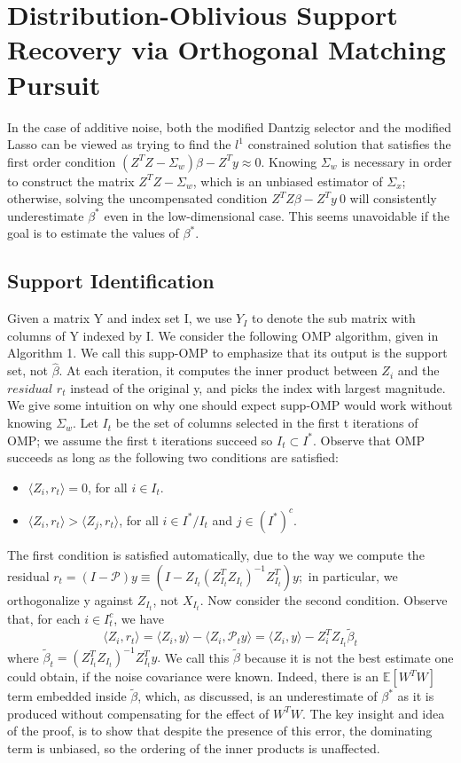 \documentclass[a4paper,10pt]{article}
\theoremstyle{definition}
\begin{document}
\section{Distribution-Oblivious Support Recovery via Orthogonal Matching Pursuit}
In the case of additive noise, both the modified Dantzig selector and the modified Lasso can be viewed as trying to find the $l^1$ constrained solution that satisfies the first order condition $(Z^TZ - \Sigma_w)\beta-Z^Ty \approx 0$. Knowing $\Sigma_w$ is necessary in order to construct the matrix $Z^TZ-\Sigma_w$, which is an unbiased estimator of $\Sigma_x$; otherwise, solving the uncompensated condition $Z^TZ\beta - Z^Ty ~ 0$ will consistently underestimate $\beta^*$ even in the low-dimensional case. This seems unavoidable if the goal is to estimate the values of $\beta^*$.

\subsection{Support Identification}
Given a matrix Y and index set I, we use $Y_I$ to denote the sub matrix with columns of Y indexed by I. We consider the following OMP algorithm, given in Algorithm 1. We call this supp-OMP to emphasize that its output is the support set, not $\hat{\beta}$. At each iteration, it computes the inner product between $Z_i$ and the $residual$ $r_t$ instead of the original y, and picks the index with largest magnitude.\\
We give some intuition on why one should expect supp-OMP would work without knowing $\Sigma_w$. Let $I_t$ be the set of columns selected in the first t iterations of OMP; we assume the first t iterations succeed so $I_t \subset I^*$. Observe that OMP succeeds as long as the following two conditions are satisfied:
\begin{itemize}
	\item $\langle Z_i,r_t\rangle = 0$, for all $i\in I_t$.
	\item $\langle Z_i,r_t\rangle > \langle Z_j,r_t\rangle$, for all $i \in I^*/I_t$ and $j\in (I^*)^c$.
\end{itemize}

The first condition is satisfied automatically, due to the way we compute the residual $r_t = (I-\mathcal{P})y \equiv (I-Z_{I_t}(Z_{I_t}^TZ_{I_t})^{-1}Z_{I_t}^T)y;$ in particular, we orthogonalize y against $Z_{I_t}$, not $X_{I_t}$. Now consider the second condition. Observe that, for each $i\in I^c_t$, we have
\begin{equation*}
	\langle Z_i, r_t \rangle = \langle Z_i,y \rangle - \langle Z_i, \mathcal{P}_ty \rangle = \langle Z_i,y \rangle - Z_i^T Z_{I_t} \tilde{\beta}_t
\end{equation*}
where $\tilde{\beta}_t = (Z_{I_t}^T Z_{I_t})^{-1}Z_{I_t}^Ty.$ We call this $\tilde{\beta}$ because it is not the best estimate one could obtain, if the noise covariance were known. Indeed, there is an $\mathbb{E}[W^TW]$ term embedded inside $\tilde{\beta}$, which, as discussed, is an underestimate of $\beta^*$ as it is produced without compensating for the effect of $W^TW$. The key insight and idea of the proof, is to show that despite the presence of this error, the dominating term is unbiased, so the ordering of the inner products is unaffected.
\end{document}
